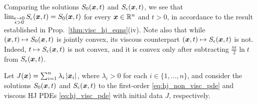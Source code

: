 \begin{example}
Comparing the solutions $S_0(\boldsymbol{x},t)$ and $S_\epsilon(\boldsymbol{x},t)$, we see that $\lim_{\substack{\epsilon\to0\\
\epsilon>0}}S_{\epsilon}(\boldsymbol{x},t)=S_0(\boldsymbol{x},t)$ for every $\boldsymbol{x}\in\mathbb{R}^n$ and $t>0$, in accordance to the result established in Prop.~\ref{thm:visc_hj_eqns}(iv). Note also that while $(\boldsymbol{x},t)\mapsto S_0(\boldsymbol{x},t)$ is jointly convex, its viscous counterpart $(\boldsymbol{x},t)\mapsto S_\epsilon(\boldsymbol{x},t)$ is not. Indeed, $t \mapsto S_\epsilon(\boldsymbol{x},t)$ is not convex, and it is convex only after subtracting $\frac{n\epsilon}{2}\ln t$ from $S_{\epsilon}(\boldsymbol{x},t)$.
\end{example}

\begin{example} \label{ex:smooth_shrink} 
Let $J(\boldsymbol{x})=\sum_{i=1}^{n}\lambda_{i}\left|\boldsymbol{x}_{i}\right|$, where $\lambda_{i}>0$ for each $i\in\{1,\dots,n\}$, and consider the solutions $S_0(\boldsymbol{x},t)$ and $S_{\epsilon}(\boldsymbol{x},t)$ to the first-order \eqref{eq:hj_non_visc_pde} and viscous HJ PDEs \eqref{eq:hj_visc_pde} with initial data $J$, respectively.


\end{example}

